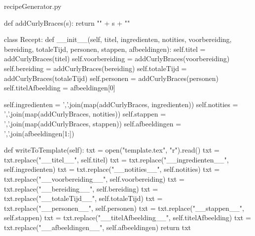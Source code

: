 \begin{filecontents*}{recipeGenerator.py}

def addCurlyBraces(s):
    return "{" + s + "}"

class Recept:
    def __init__(self, titel, ingredienten, notities, voorbereiding, bereiding, totaleTijd, personen, stappen, afbeeldingen):
        self.titel = addCurlyBraces(titel)
        self.voorbereiding = addCurlyBraces(voorbereiding)
        self.bereiding = addCurlyBraces(bereiding)
        self.totaleTijd = addCurlyBraces(totaleTijd)
        self.personen = addCurlyBraces(personen)
        self.titelAfbeelding = afbeeldingen[0]
        
        self.ingredienten = ','.join(map(addCurlyBraces, ingredienten))
        self.notities = ','.join(map(addCurlyBraces, notities))
        self.stappen = ','.join(map(addCurlyBraces, stappen))
        self.afbeeldingen = ','.join(afbeeldingen[1:])
    
    def writeToTemplate(self):
        txt = open("template.tex", "r").read()
        txt = txt.replace("__titel__", self.titel)
        txt = txt.replace("__ingredienten__", self.ingredienten)
        txt = txt.replace("__notities__", self.notities)
        txt = txt.replace("__voorbereiding__", self.voorbereiding)
        txt = txt.replace("__bereiding__", self.bereiding)
        txt = txt.replace("__totaleTijd__", self.totaleTijd)
        txt = txt.replace("__personen__", self.personen)
        txt = txt.replace("__stappen__", self.stappen)
        txt = txt.replace("__titelAfbeelding__", self.titelAfbeelding)
        txt = txt.replace("__afbeeldingen__", self.afbeeldingen)
        return txt


\end{filecontents*}
